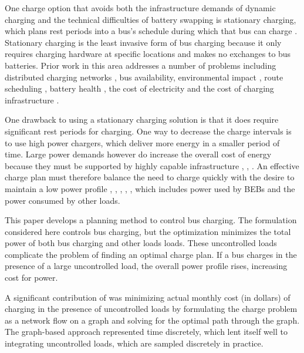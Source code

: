 \par One charge option that avoids both the infrastructure demands of dynamic charging and the technical difficulties of battery swapping is stationary charging, which plans rest periods into a bus's schedule during which that bus can charge \cite{whitaker_network_nodate}. Stationary charging is the least invasive form of bus charging because it only requires charging hardware at specific locations and makes no exchanges to bus batteries. Prior work in this area addresses a number of problems including distributed charging networks \cite{Nimalsiri2020}, bus availability, environmental impact \cite{zhou_bi-objective_2021}, route scheduling \cite{Rinalde_Mixed_2020}, battery health \cite{houbbadi_optimal_2019}, the cost of electricity \cite{Leou_optimal_2017} and the cost of charging infrastructure \cite{Wei2018}.
\par One drawback to using a stationary charging solution is that it does require significant rest periods for charging. One way to decrease the charge intervals is to use high power chargers, which deliver more energy in a smaller period of time. Large power demands however do increase the overall cost of energy because they must be supported by highly capable infrastructure \cite{stahleder_impact_2019}, \cite{deb_impact_2017}, \cite{boonraksa_impact_2019}. An effective charge plan must therefore balance the need to charge quickly with the desire to maintain a low power profile \cite{cheng_smart_2020}, \cite{ojer_development_2020}, \cite{qin_numerical_2016}, \cite{bagherinezhad_spatio-temporal_2020}, \cite{Wang2019}, \cite{He_2019_Fast} which includes power used by BEBs and the power consumed by other loads.

\par This paper develops a planning method to control bus charging.  The formulation considered here controls bus charging, but the optimization minimizes the total power of both bus charging and other loads loads. These uncontrolled loads complicate the problem of finding an optimal charge plan. If a bus charges in the presence of a large uncontrolled load, the overall power profile rises, increasing cost for power.

\par A significant contribution of \cite{mortensen_comprehensive_2021} was minimizing actual monthly cost (in dollars) of charging in the presence of uncontrolled loads by formulating the charge problem as a network flow on a graph and solving for the optimal path through the graph. The graph-based approach represented time discretely, which lent itself well to integrating uncontrolled loads, which are sampled discretely in practice.

